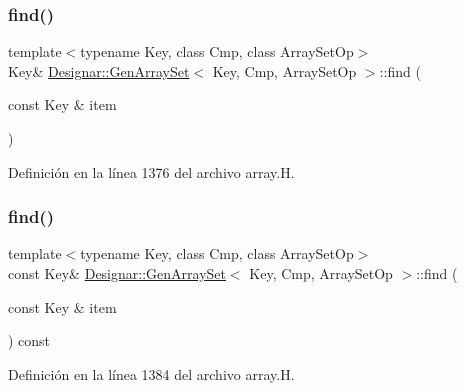\subsubsection{\texorpdfstring{find()}{find()}\hspace{0.1cm}{\footnotesize\ttfamily [1/2]}}
{\footnotesize\ttfamily template$<$typename Key, class Cmp, class Array\+Set\+Op$>$ \\
Key\& \hyperlink{class_designar_1_1_gen_array_set}{Designar\+::\+Gen\+Array\+Set}$<$ Key, Cmp, Array\+Set\+Op $>$\+::find (\begin{DoxyParamCaption}\item[{const Key \&}]{item }\end{DoxyParamCaption})\hspace{0.3cm}{\ttfamily [inline]}}



Definición en la línea 1376 del archivo array.\+H.

\mbox{\label{class_designar_1_1_gen_array_set_aab0576267b8f88e6e7ec2d31aa768449}} 
\subsubsection{\texorpdfstring{find()}{find()}\hspace{0.1cm}{\footnotesize\ttfamily [2/2]}}
{\footnotesize\ttfamily template$<$typename Key, class Cmp, class Array\+Set\+Op$>$ \\
const Key\& \hyperlink{class_designar_1_1_gen_array_set}{Designar\+::\+Gen\+Array\+Set}$<$ Key, Cmp, Array\+Set\+Op $>$\+::find (\begin{DoxyParamCaption}\item[{const Key \&}]{item }\end{DoxyParamCaption}) const\hspace{0.3cm}{\ttfamily [inline]}}



Definición en la línea 1384 del archivo array.\+H.

\mbox{\label{class_designar_1_1_gen_array_set_aceb48fb98d254005b82fd538b6ac0c35}} 
